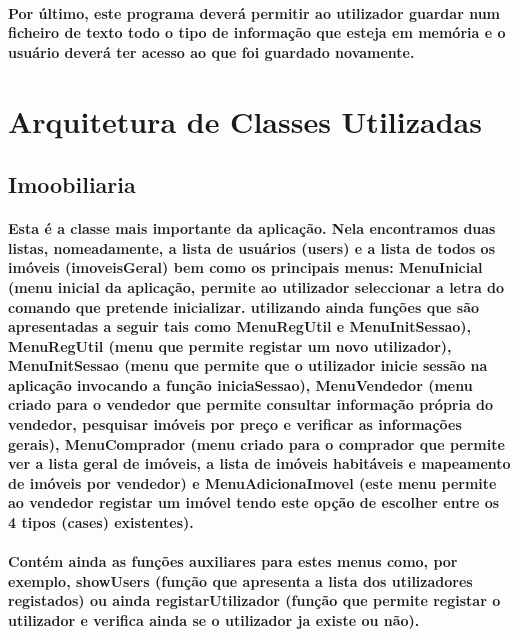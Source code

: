 \documentclass{article}
\begin{document}
\paragraph{Por último, este programa deverá permitir ao utilizador guardar num ficheiro de texto todo o tipo de informação que esteja em memória e o usuário deverá ter acesso ao que foi guardado novamente.}

\newpage

\section{Arquitetura de Classes Utilizadas}

\subsection{\textbf{Imoobiliaria}}

\paragraph{Esta é a classe mais importante da aplicação. Nela encontramos duas listas, nomeadamente, a lista de usuários (users) e a lista de todos os imóveis (imoveisGeral) bem como os principais menus: MenuInicial (menu inicial da aplicação, permite ao utilizador seleccionar a letra do comando que pretende inicializar. utilizando ainda funções que são apresentadas a seguir tais como MenuRegUtil e MenuInitSessao), MenuRegUtil (menu que permite registar um novo utilizador), MenuInitSessao (menu que permite que o utilizador inicie sessão na aplicação invocando a função iniciaSessao), MenuVendedor (menu criado para o vendedor que permite consultar informação própria do vendedor, pesquisar imóveis por preço e verificar as informações gerais), MenuComprador (menu criado para o comprador que permite ver a lista geral de imóveis, a lista de imóveis habitáveis e mapeamento de imóveis por vendedor) e MenuAdicionaImovel (este menu permite ao vendedor registar um imóvel tendo este opção de escolher entre os 4 tipos (cases) existentes).}
\paragraph{Contém ainda as funções auxiliares para estes menus como, por exemplo, showUsers (função que apresenta a lista dos utilizadores registados) ou ainda registarUtilizador (função que permite registar o utilizador e verifica ainda se o utilizador ja existe ou não).}
\end{document}
